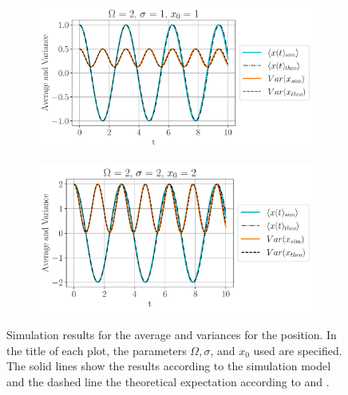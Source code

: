 \begin{figure}[h!]
\begin{subfigure}[h]{0.65\textwidth}
     \end{subfigure}
     \begin{subfigure}[h]{0.4\textwidth}
         \centering
         \includegraphics[width=\textwidth]{plot/Omega2_sigma1_x01_Averages.pdf}
         \caption{}
     \end{subfigure}
     \begin{subfigure}[h]{0.65\textwidth}
         \centering
         \includegraphics[width=\textwidth]{plot/Omega2_sigma2_x02_Averages.pdf}
         \caption{}
     \end{subfigure}
\caption{Simulation results for the average and variances for the position. In the title of each plot, the parameters $\Omega, \sigma$, and $x_0$ used are specified. The solid lines show the results according to the simulation model and the dashed line the theoretical expectation according to  and .}
\label{fig: Averages}
\end{figure}

